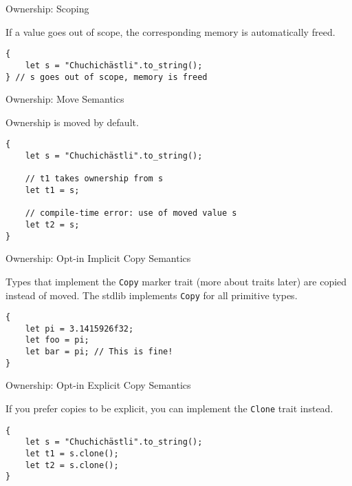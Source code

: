 
\begin{frame}[fragile]{Ownership: Scoping}

If a value goes out of scope, the corresponding memory is automatically freed.

\begin{verbatim}
{
    let s = "Chuchichästli".to_string();
} // s goes out of scope, memory is freed
\end{verbatim}

\end{frame}


\begin{frame}[fragile]{Ownership: Move Semantics}

Ownership is moved by default.

\begin{verbatim}
{
    let s = "Chuchichästli".to_string();

    // t1 takes ownership from s
    let t1 = s;

    // compile-time error: use of moved value s
    let t2 = s;
}
\end{verbatim}

\end{frame}


\begin{frame}[fragile]{Ownership: Opt-in Implicit Copy Semantics}

Types that implement the \texttt{Copy} marker trait (more about traits later)
are copied instead of moved. The stdlib implements \texttt{Copy} for all
primitive types.

\begin{verbatim}
{
    let pi = 3.1415926f32;
    let foo = pi;
    let bar = pi; // This is fine!
}
\end{verbatim}

\end{frame}


\begin{frame}[fragile]{Ownership: Opt-in Explicit Copy Semantics}

If you prefer copies to be explicit, you can implement the \texttt{Clone} trait
instead.

\begin{verbatim}
{
    let s = "Chuchichästli".to_string();
    let t1 = s.clone();
    let t2 = s.clone();
}
\end{verbatim}

\end{frame}

